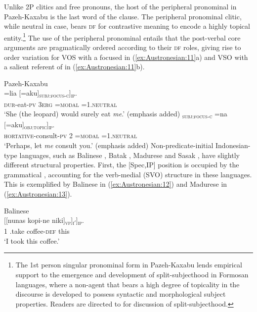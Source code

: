 \documentclass[output=paper,chinesefont]{../langscibook}
\begin{document}
Unlike 2P clitics and free pronouns, the host of the peripheral pronominal in Pazeh-Kaxabu is the last word of the clause. The peripheral pronominal clitic, while neutral in case, bears \textsc{df} for contrastive meaning to encode a highly topical entity.\footnote{The 1st person singular pronominal form in Pazeh-Kaxabu lends empirical support to the emergence and development of split-subjecthood in Formosan languages, where a non-\SUBJ agent that bears a high degree of topicality in the discourse is developed to possess syntactic and morphological subject properties. Readers are directed to \citet{LiuKL2017} for discussion of split-subjecthood.} The use of the peripheral pronominal entails that the post-verbal core arguments are pragmatically ordered according to their \textsc{df} roles, giving rise to order variation for VOS with a focused \SUBJ in (\ref{ex:Austronesian:11}a) and VSO with a salient referent of \OBJ in (\ref{ex:Austronesian:11}b).

\ea\label{ex:Austronesian:11} Pazeh-Kaxabu   \citep[96]{Li2002}\\
\ea\gll
[Ka-kan-en [nimisiw]\textsubscript{\OBJ} =lia [=aku]\textsubscript{\textsc{subj:focus-c}}]\textsubscript{\textsc{ip}}. \\
\phantom{[}\textsc{dur}-eat-\textsc{pv} \phantom{[}3\textsc{erg} =\textsc{modal} \phantom{[}={1\SG}.\textsc{neutral}\\
\glt `She (the leopard) would surely eat \emph{me}.' (emphasis added)
\ex\gll
[Ta-padudu-i [isiw]\textsubscript{\textsc{subj:focus-c}} =na [=aku]\textsubscript{\textsc{obj:topic}}]\textsubscript{\textsc{ip}}. \\
\phantom{[}\textsc{hortative}-consult-\textsc{pv} \phantom{[}2{\SG} =\textsc{modal} ={1\SG}.\textsc{neutral}\\
\glt`Perhaps, let \emph{me} consult you.' (emphasis added)
\z\z
Non-predicate-initial Indonesian-type languages, such as Balinese \citep{arka2003}, Batak \citep{Erlewine2018}, Madurese \citep[249]{Davies2010} and Sasak \citep{Wouk2002}, have slightly different structural properties. First, the [Spec,IP] position is occupied by the grammatical \SUBJ, accounting for the verb-medial (SVO) structure in these languages. This is exemplified by Balinese in (\ref{ex:Austronesian:12}) and Madurese in (\ref{ex:Austronesian:13}). 

\ea\label{ex:Austronesian:12} Balinese \citep[78]{Arka2003b}\\
\gll [[Tiang]\textsubscript{\SUBJ} [[nunas kopi-ne niki]\textsubscript{\textsc{vp}}]\textsubscript{\textsc{i$'$}}]\textsubscript{\textsc{ip}}.\\
 \phantom{[[}1  \phantom{[[}\AV.take coffee-\textsc{def} this\\
\glt`I took this coffee.'
\z
\end{document}
